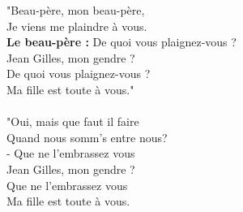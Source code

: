 %
"Beau-père, mon beau-père,
\\Je viens me plaindre à vous. \bissimple
\\\textbf{Le beau-père : }De quoi vous plaignez-vous ?
\\ Jean Gilles, mon gendre ?
\\De quoi vous plaignez-vous ? 
\\Ma fille est toute à vous."
\\\\"Oui, mais que faut il faire
\\Quand nous somm's entre nous? \bissimple
\\- Que ne l'embrassez vous
\\Jean Gilles, mon gendre ? 
\\Que ne l'embrassez vous
\\Ma fille est toute à vous.
